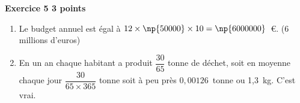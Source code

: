 \textbf{Exercice 5 \hfill 3 points}

\medskip

\begin{enumerate}
\item %
 
Le budget annuel est égal à $12 \times \np{50000} \times 10 = \np{6000000}$~\euro. (6 millions d'euros)
\item %
 
En un an chaque habitant a produit $\dfrac{30}{65}$ tonne de déchet, soit en moyenne chaque jour $\dfrac{30}{65 \times 365}$ tonne  soit à peu près $0,00126$~tonne ou 1,3~kg. C'est vrai. 
\end{enumerate}

\bigskip

